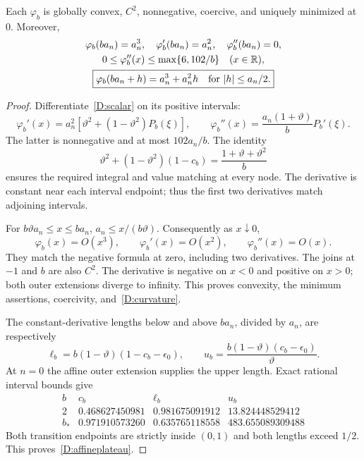\begin{lemma}\label{D:scalarlemma}
Each $\varphi_b$ is globally convex, $C^2$, nonnegative, coercive, and uniquely minimized at $0$. Moreover,
\begin{gather}
 \varphi_b(ba_n)=a_n^3,\quad
 \varphi_b'(ba_n)=a_n^2,\quad\varphi_b''(ba_n)=0,\label{D:jets}\\
 0\le\varphi_b''(x)\le\max\{6,102/b\}\quad(x\in\mathbb R),\label{D:curvature}\\
 \boxed{\varphi_b(ba_n+h)=a_n^3+a_n^2h\quad\text{for }|h|\le a_n/2.}\label{D:affineplateau}
\end{gather}
\end{lemma}
\begin{proof}
Differentiate~\eqref{D:scalar} on its positive intervals:
\[
 \varphi_b'(x)=a_n^2[\vartheta^2+(1-\vartheta^2)P_b(\xi)],
 \qquad
 \varphi_b''(x)=\frac{a_n(1+\vartheta)}bP_b'(\xi).
\]
The latter is nonnegative and at most $102a_n/b$. The identity
\[
 \vartheta^2+(1-\vartheta^2)(1-c_b)
 =\frac{1+\vartheta+\vartheta^2}{b}
\]
ensures the required integral and value matching at every node. The derivative is constant near each interval endpoint; thus the first two derivatives match adjoining intervals.

For $b\vartheta a_n\le x\le ba_n$, $a_n\le x/(b\vartheta)$. Consequently as $x\downarrow0$,
\[
 \varphi_b(x)=O(x^3),\qquad\varphi_b'(x)=O(x^2),\qquad
 \varphi_b''(x)=O(x).
\]
They match the negative formula at zero, including two derivatives. The joins at $-1$ and $b$ are also $C^2$. The derivative is negative on $x<0$ and positive on $x>0$; both outer extensions diverge to infinity. This proves convexity, the minimum assertions, coercivity, and~\eqref{D:curvature}.

The constant-derivative lengths below and above $ba_n$, divided by $a_n$, are respectively
\[
 \ell_b=b(1-\vartheta)(1-c_b-\epsilon_0),\qquad
 u_b=\frac{b(1-\vartheta)(c_b-\epsilon_0)}{\vartheta}.
\]
At $n=0$ the affine outer extension supplies the upper length. Exact rational interval bounds give
\[
\begin{array}{c|ccc}
 b&c_b&\ell_b&u_b\\\hline
2&0.468627450981&0.981675091912&13.824448529412\\
b_*&0.971910573260&0.635765118558&483.655089309488
\end{array}
\]
Both transition endpoints are strictly inside $(0,1)$ and both lengths exceed $1/2$. This proves~\eqref{D:affineplateau}.
\end{proof}

